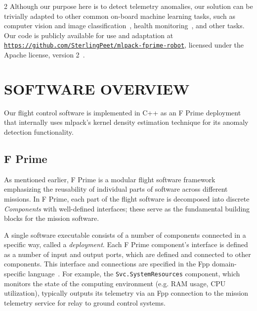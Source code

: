 \documentclass[10pt, fleqn]{article}
\begin{document}
\begin{multicols*}{2}
Although our purpose here is to detect telemetry anomalies,
our solution can be trivially adapted to other common on-board machine learning tasks,
such as computer vision and image classification~\cite{giuffrida2021varphi,leon2023accelerating},
health monitoring~\cite{volponi2008enhanced},
and other tasks.
Our code is publicly available for use and adaptation at
\href{https://github.com/SterlingPeet/mlpack-fprime-robot}{\footnotesize \tt https://github.com/SterlingPeet/mlpack-fprime-robot},
licensed under the Apache license, version 2~\cite{apache2license}.
\vspace*{0.5em}

\section{SOFTWARE OVERVIEW}

\vspace*{-0.3em}
Our flight control software is implemented in C++ as
an F Prime deployment
that internally uses mlpack's
kernel density estimation technique
for its anomaly detection functionality.

\subsection{F Prime}

\vspace*{-0.3em}
As mentioned earlier,
F Prime is a modular flight software framework
emphasizing the reusability of individual parts of software across different missions.
In F Prime,
each part of the flight software is
decomposed into discrete {\it Components}
with well-defined interfaces;
these serve as the fundamental building blocks
for the mission software.

A single software executable consists of a number of components
connected in a specific way,
called a {\it deployment}.
Each F Prime component's interface is defined as a
number of input and output ports,
which are defined and connected to other components.
This interface and connections are specified in the
Fpp domain-specific language~\cite{bocchino2022fpp}.
For example,
the {\small \tt Svc.SystemResources} component,
which monitors the state of the computing environment
(e.g. RAM usage, CPU utilization),
typically outputs its telemetry via an Fpp connection
to the mission telemetry service for relay to ground control systems.


\end{multicols*}
\end{document}
